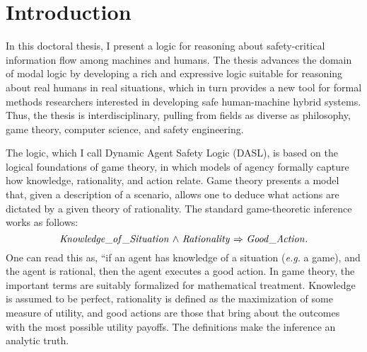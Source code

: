 \chapter{Introduction}
	\label{CH_Intro}

In this doctoral thesis, I present a logic for reasoning about safety-critical information flow among machines and humans. The thesis advances the domain of modal logic by developing a rich and expressive logic suitable for reasoning about real humans in real situations, which in turn provides a new tool for formal methods researchers interested in developing safe human-machine hybrid systems. Thus, the thesis is interdisciplinary, pulling from fields as diverse as philosophy, game theory, computer science, and safety engineering.  
%

The logic, which I call Dynamic Agent Safety Logic (DASL), is based on the logical foundations of game theory, in which models of agency formally capture how knowledge, rationality, and action relate. Game theory presents a model that, given a description of a scenario, allows one to deduce what actions are dictated by a given theory of rationality. The standard game-theoretic inference works as follows:
\begin{equation*}
\mathit{Knowledge\_of\_Situation} {\ \wedge \ } \mathit{Rationality} {\ \Rightarrow \ } \mathit{Good\_Action}.
\end{equation*}
One can read this as, ``if an agent has knowledge of a situation (\emph{e.g.} a game), and the agent is rational, then the agent executes a good action. In game theory, the important terms are suitably formalized for mathematical treatment. Knowledge is assumed to be perfect, rationality is defined as the maximization of some measure of utility, and good actions are those that bring about the outcomes with the most possible utility payoffs. The definitions make the inference an analytic truth.

